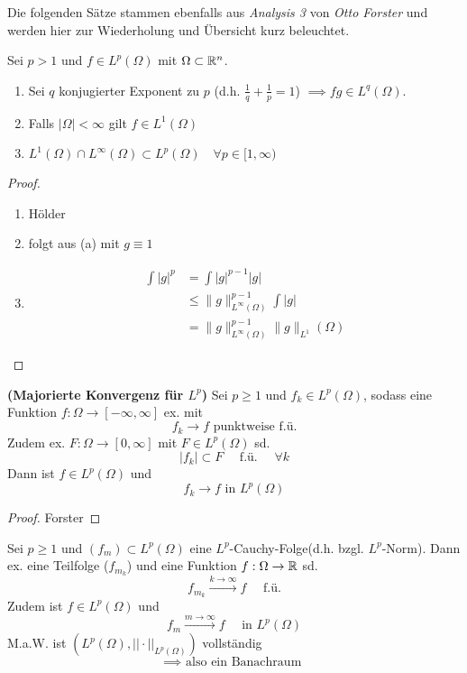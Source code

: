 Die folgenden S\"atze stammen ebenfalls aus \textit{Analysis 3} von \textit{Otto Forster} und werden hier zur Wiederholung und Übersicht kurz beleuchtet.

\begin{satz}
	Sei $p > 1$ und $f \in L^p(\Omega)$ mit $\Omega \subset \mathbb{R}^n$. 
	\renewcommand{\labelenumi}{(\alph{enumi})}
	\begin{enumerate}
		\item Sei $q$ konjugierter Exponent zu $p$ (d.h. $\frac{1}{q} + \frac{1}{p}=1$)
			$\implies fg \in L^q(\Omega)$.
		\item Falls $|\Omega| < \infty$ gilt $f \in L^1(\Omega)$
		\item $ L^1(\Omega) \cap L^{\infty}(\Omega) \subset L^p(\Omega) \quad \forall p\in [1,\infty) $
	\end{enumerate}
\end{satz}

\begin{proof}\
	\renewcommand{\labelenumi}{(\alph{enumi})}
	\begin{enumerate}
		\item H\"older
		\item folgt aus (a) mit $g\equiv1$
		\item
			\begin{align*}
				\int |g|^p &= \int |g|^{p-1}|g| \\
									 &\leq \|g\|^{p-1}_{L^\infty(\Omega)}\int |g| \\
									 &= \|g\|^{p-1}_{L^\infty(\Omega)}\|g\|_{L^1}(\Omega)
			\end{align*}
	\end{enumerate}

\end{proof}

\begin{satz}\textbf{(Majorierte Konvergenz für $L^p$)} \enter
	Sei $p \geq 1$ und $f_k \in L^p(\Omega)$, sodass eine Funktion $f:\Omega\to [-\infty,\infty]$ ex. mit
	\[f_k \to f\text{ punktweise f.\"u.}\]
	Zudem ex. $F: \Omega \to [0,\infty]$ mit $F \in L^p(\Omega)$ sd. 
	\[|f_k| \subset F \quad \text{ f.\"u. } \quad \forall k\]
	Dann ist $f\in L^p(\Omega)$ und 
	\[f_k \to f \text{ in }L^p(\Omega)\]
\end{satz}

\begin{proof}
	Forster
\end{proof}

\begin{satz} \enter
	Sei $p \geq 1$ und $(f_m) \subset L^p(\Omega)$ eine $L^p$-Cauchy-Folge(d.h.
	bzgl. $L^p$-Norm).\enter
	Dann ex. eine Teilfolge ($f_{m_k}$) und eine Funktion
	$f:\Omega\to \mathbb{R}$ sd. 
	\[f_{m_k} \overset{k\to \infty}{\longrightarrow} f \quad \text{ f.ü.}\]
	Zudem ist $f\in L^p(\Omega)$ und
	\[f_m \stackrel{m\rightarrow \infty}{\longrightarrow} f \quad \text{ in }
	L^p(\Omega)\]
	M.a.W. ist $\left(L^p(\Omega), ||\cdot||_{L^p(\Omega)}\right)$ vollst\"andig 
	\[\implies \text{ also ein Banachraum } \]
\end{satz}

